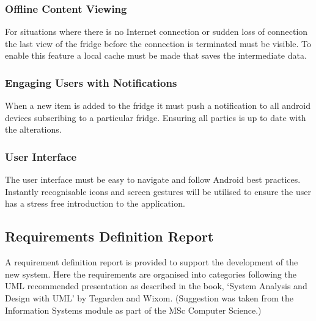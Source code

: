 \documentclass[a4paper, 11pt]{article}
\begin{document}
\subsubsection{Offline Content Viewing}
For situations where there is no Internet connection or sudden loss of connection the last view of the fridge before the connection is terminated must be visible. To enable this feature a local cache must be made that saves the intermediate data.

\subsubsection{Engaging Users with Notifications}
When a new item is added to the fridge it must push a notification to all android devices subscribing to a particular fridge.  Ensuring all parties is up to date with the alterations. 

\subsubsection{User Interface}
The user interface must be easy to navigate and follow Android best practices. Instantly recognisable icons and screen gestures will be utilised to ensure the user has a stress free introduction to the application.

\subsection{Requirements Definition Report}
A requirement definition report is provided to support the development of the new system. Here the requirements are organised into categories following the UML recommended presentation as described in the book, `System Analysis and Design with UML' by Tegarden and Wixom. (Suggestion was taken from the Information Systems module as part of the MSc Computer Science.)
\end{document}
